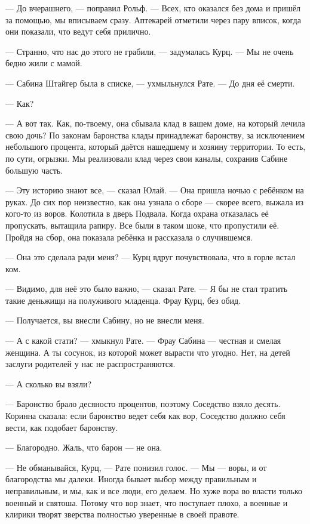--- До вчерашнего, --- поправил Рольф.
--- Всех, кто оказался без дома и пришёл за помощью, мы вписываем сразу.
Аптекарей отметили через пару вписок, когда они показали, что ведут себя прилично.

--- Странно, что нас до этого не грабили, --- задумалась Курц.
--- Мы не очень бедно жили с мамой.

--- Сабина Штайгер была в списке, --- ухмыльнулся Рате.
--- До дня её смерти.

--- Как?

--- А вот так.
Как, по-твоему, она сбывала клад в вашем доме, на который лечила свою дочь?
По законам баронства клады принадлежат баронству, за исключением небольшого процента, который даётся нашедшему и хозяину территории.
То есть, по сути, огрызки.
Мы реализовали клад через свои каналы, сохранив Сабине большую часть.

--- Эту историю знают все, --- сказал Юлай.
--- Она пришла ночью с ребёнком на руках.
До сих пор неизвестно, как она узнала о сборе --- скорее всего, выжала из кого-то из воров.
Колотила в дверь Подвала.
Когда охрана отказалась её пропускать, вытащила рапиру.
Все были в таком шоке, что пропустили её.
Пройдя на сбор, она показала ребёнка и рассказала о случившемся.

--- Она это сделала ради меня? --- Курц вдруг почувствовала, что в горле встал ком.

--- Видимо, для неё это было важно, --- сказал Рате.
--- Я бы не стал тратить такие деньжищи на полуживого младенца.
Фрау Курц, без обид.

--- Получается, вы внесли Сабину, но не внесли меня.

--- А с какой стати? --- хмыкнул Рате.
--- Фрау Сабина --- честная и смелая женщина.
А ты сосунок, из которой может вырасти что угодно.
Нет, на детей заслуги родителей у нас не распространяются.

--- А сколько вы взяли?

--- Баронство брало десяносто процентов, поэтому Соседство взяло десять.
Коринна сказала: если баронство ведет себя как вор, Соседство должно себя вести, как подобает баронству.

--- Благородно.
Жаль, что барон — не она.

--- Не обманывайся, Курц, --- Рате понизил голос.
--- Мы --- воры, и от благородства мы далеки.
Иногда бывает выбор между правильным и неправильным, и мы, как и все люди, его делаем.
Но хуже вора во власти только военный и святоша.
Потому что вор знает, что поступает плохо, а военные и клирики творят зверства полностью уверенные в своей правоте.

